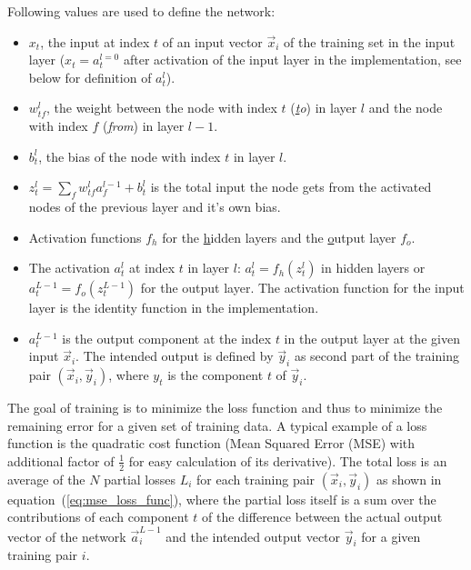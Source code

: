 Following values are used to define the network:
\begin{itemize}
    \item $x_t$, the input at index $t$ of an input vector $\vec{x}_i$ of the training set
    in the input layer ($x_t = a^{l=0}_t$ after activation of the input layer in the
    implementation, see below for definition of $a^l_t$).

    \item $w^l_{tf}$, the weight between the node with index $t$ (\emph{\underline{t}o})
    in layer $l$ and the node with index $f$ (\emph{\underline{f}rom}) in layer $l-1$.

    \item $b^l_t$, the bias of the node with index $t$ in layer $l$.
    
    \item $z^l_t = \sum_{f}{w^l_{tf} a^{l-1}_f} + b^l_t$ is the total input the node gets
    from the activated nodes of the previous layer and it's own bias.
    
    \item Activation functions $f_h$ for the \underline{h}idden layers and the
    \underline{o}utput layer $f_o$.
    
    \item The activation $a^l_t$ at index $t$ in layer $l$: $a^l_t = f_h(z^l_t)$ in hidden
    layers or $a^{L-1}_t = f_o(z^{L-1}_t)$ for the output layer. The activation function
    for the input layer is the identity function in the implementation.

    \item $a^{L-1}_t$ is the output component at the index $t$ in the output layer at the
    given input $\vec{x}_i$. The intended output is defined by $\vec{y}_i$ as second part
    of the training pair $(\vec{x}_i, \vec{y}_i)$, where $y_t$ is the component $t$ of
    $\vec{y}_i$.
\end{itemize}

The goal of training is to minimize the loss function and thus to minimize the remaining
error for a given set of training data.  A typical example of a loss function is the
quadratic cost function (Mean Squared Error (MSE) with additional factor of $\frac{1}{2}$
for easy calculation of its derivative). The total loss is an average of the $N$ partial
losses $L_i$ for each training pair $(\vec{x}_i, \vec{y}_i)$ as shown in
equation~(\ref{eq:mse_loss_func}), where the partial loss itself is a sum over the
contributions of each component $t$ of the difference between the actual output vector of
the network $\vec{a}^{L-1}_i$ and the intended output vector $\vec{y}_i$ for a given
training pair $i$.

